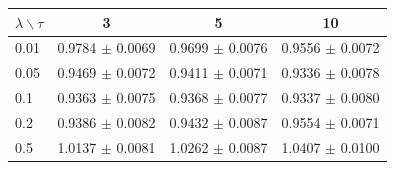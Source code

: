 \begin{tabular}{lccc}
\toprule
$\lambda \backslash \tau$ & 3 & 5 & 10 \\
\midrule
0.01 & 0.9784 $\pm$ 0.0069 & 0.9699 $\pm$ 0.0076 & 0.9556 $\pm$ 0.0072 \\
0.05 & 0.9469 $\pm$ 0.0072 & 0.9411 $\pm$ 0.0071 & 0.9336 $\pm$ 0.0078 \\
0.1 & 0.9363 $\pm$ 0.0075 & 0.9368 $\pm$ 0.0077 & 0.9337 $\pm$ 0.0080 \\
0.2 & 0.9386 $\pm$ 0.0082 & 0.9432 $\pm$ 0.0087 & 0.9554 $\pm$ 0.0071 \\
0.5 & 1.0137 $\pm$ 0.0081 & 1.0262 $\pm$ 0.0087 & 1.0407 $\pm$ 0.0100 \\
\bottomrule
\end{tabular}
